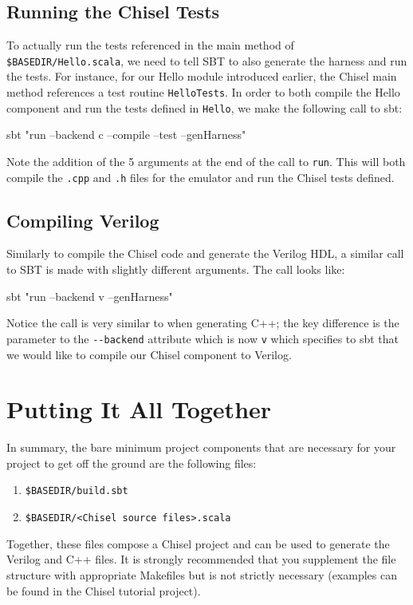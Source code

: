 \subsection{Running the Chisel Tests}

To actually run the tests referenced in the main method of \verb+$BASEDIR/Hello.scala+, we need to tell SBT to also generate the harness and run the tests. For instance, for our Hello module introduced earlier, the Chisel main method references a test routine \verb+HelloTests+. In order to both compile the Hello component and run the tests defined in \verb+Hello+, we make the following call to sbt:

\begin{bash}
sbt "run --backend c --compile --test --genHarness"
\end{bash}

Note the addition of the 5 arguments at the end of the call to \verb+run+. This will both compile the \verb+.cpp+ and \verb+.h+ files for the emulator and run the Chisel tests defined. 

\subsection{Compiling Verilog}

Similarly to compile the Chisel code and generate the Verilog HDL, a similar call to SBT is made with slightly different arguments. The call looks like:

\begin{bash}
sbt "run --backend v --genHarness"
\end{bash}

Notice the call is very similar to when generating C++; the key difference is the parameter to the \verb+--backend+ attribute which is now \verb+v+ which specifies to sbt that we would like to compile our Chisel component to Verilog. 

\section{Putting It All Together}

In summary, the bare minimum project components that are necessary for your project to get off the ground are the following files:

\begin{enumerate}
\item \verb+$BASEDIR/build.sbt+
\item \verb+$BASEDIR/<Chisel source files>.scala+
\end{enumerate}

Together, these files compose a Chisel project and can be used to generate the Verilog and C++ files. It is strongly recommended that you supplement the file structure with appropriate Makefiles but is not strictly necessary (examples can be found in the Chisel tutorial project).

